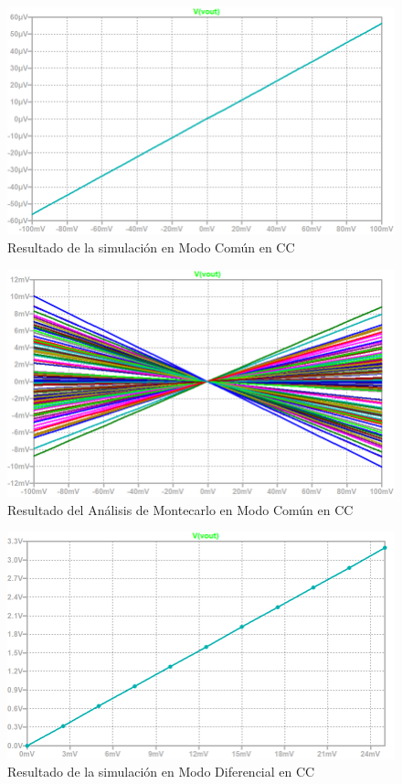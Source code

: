 \begin{figure}[!ht]
\begin{center}
\includegraphics[width=0.9\linewidth]{res/spice/spice_cm_dc.png}
\caption{Resultado de la simulación en Modo Común en CC}
\label{e4:fig_spice_cm_dc_res}
\end{center}
\end{figure}

\begin{figure}[!ht]
\begin{center}
\includegraphics[width=0.85\linewidth]{res/spice/spice_cm_dc_mc.png}
\caption{Resultado del Análisis de Montecarlo en Modo Común en CC}
\label{e4:fig_spice_cm_dc_mc}
\end{center}
\end{figure}

\begin{figure}[!ht]
\begin{center}
\includegraphics[width=0.85\linewidth]{res/spice/spice_dm_dc.png}
\caption{Resultado de la simulación en Modo Diferencial en CC}
\label{e4:fig_spice_dm_dc_res}
\end{center}
\end{figure}

